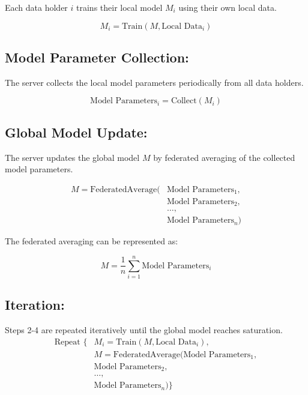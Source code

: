 \documentclass[conference]{IEEEtran}
\begin{document}
Each data holder \(i\) trains their local model \(M_i\) using their own local data.

\[ M_i = \text{Train}(M, \text{Local Data}_i) \]

\subsection{Model Parameter Collection:}

The server collects the local model parameters periodically from all data holders.

\[ \text{Model Parameters}_i = \text{Collect}(M_i) \]






\subsection{Global Model Update:}

The server updates the global model \(M\) by federated averaging of the collected model parameters.

\begin{align*}
M = \text{FederatedAverage}(&\text{Model Parameters}_1, \\
                           &\text{Model Parameters}_2, \\
                           &\ldots, \\
                           &\text{Model Parameters}_n)
\end{align*}


The federated averaging can be represented as:

\[ M = \frac{1}{n} \sum_{i=1}^{n} \text{Model Parameters}_i \]

\subsection{Iteration:}

Steps 2-4 are repeated iteratively until the global model reaches saturation.
\begin{align*}
\text{Repeat } \{ &M_i = \text{Train}(M, \text{Local Data}_i), \\
                 &M = \text{FederatedAverage}(\text{Model Parameters}_1, \\
                                            &\text{Model Parameters}_2, \\
                                            &\ldots, \\
                                            &\text{Model Parameters}_n) \}
\end{align*}
\end{document}

